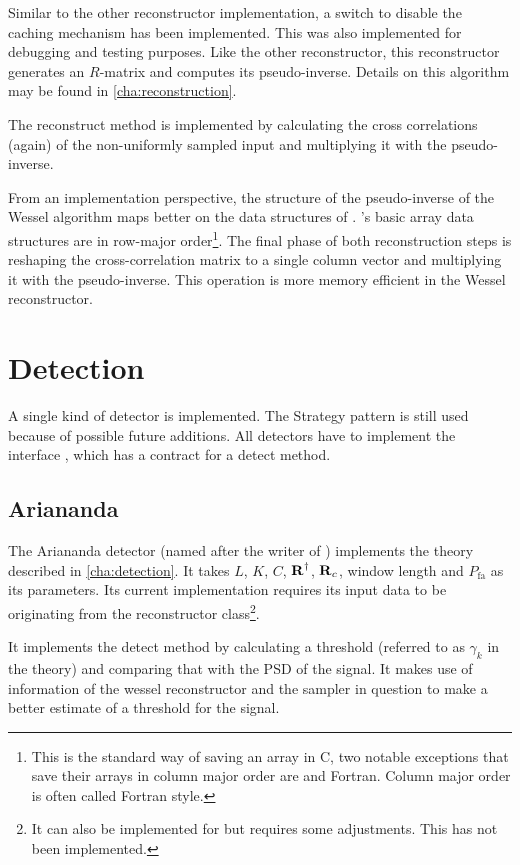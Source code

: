\documentclass[a4paper, openany, oneside]{memoir}
\begin{document}
Similar to the other reconstructor implementation, a switch to disable the caching mechanism has been implemented. This was also implemented for debugging and testing purposes. Like the other reconstructor, this reconstructor generates an $R$-matrix and computes its pseudo-inverse. Details on this algorithm may be found in \cref{cha:reconstruction}.

The reconstruct method is implemented by calculating the cross correlations (again) of the non-uniformly sampled input and multiplying it with the pseudo-inverse.

From an implementation perspective, the structure of the pseudo-inverse of the Wessel algorithm maps better on the data structures of . 's basic array data structures are in row-major order\footnote{This is the standard way of saving an array in C, two notable exceptions that save their arrays in column major order are \matlab{} and Fortran. Column major order is often called Fortran style.}. The final phase of both reconstruction steps is reshaping the cross-correlation matrix to a single column vector and multiplying it with the pseudo-inverse. This operation is more memory efficient in the Wessel reconstructor.

\section{Detection}
\label{sec:detection}
A single kind of detector is implemented. The Strategy pattern is still used because of possible future additions. All detectors have to implement the interface , which has a contract for a detect method.

\subsection{Ariananda}
\label{sub:ariananda}
The Ariananda detector (named after the writer of \cite{ariananda2012compressive}) implements the theory described in \cref{cha:detection}. It takes $L$, $K$, $C$, $\boldsymbol{\mathbf{R}}^\dagger$, $\boldsymbol{\mathbf{R}}_c$, window length and $P_{\text{fa}}$ as its parameters. Its current implementation requires its input data to be originating from the reconstructor class\footnote{It can also be implemented for  but requires some adjustments. This has not been implemented.}.

It implements the detect method by calculating a threshold (referred to as $\gamma_k$ in the theory) and comparing that with the PSD of the signal. It makes use of information of the wessel reconstructor and the sampler in question to make a better estimate of a threshold for the signal.
\end{document}
